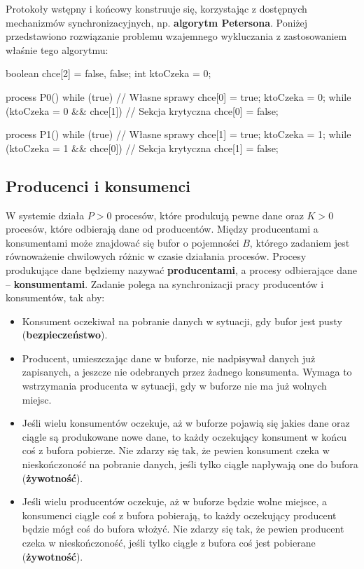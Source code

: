 Protokoły wstępny i końcowy konstruuje się, korzystając z dostępnych mechanizmów synchronizacyjnych, np. \textbf{algorytm Petersona}. Poniżej przedstawiono rozwiązanie problemu wzajemnego wykluczania z zastosowaniem właśnie tego algorytmu:
\begin{java}
    boolean chce[2] = {false, false};
    int ktoCzeka = 0;

    process P0() {
        while (true) {
            // Własne sprawy
            chce[0] = true;
            ktoCzeka = 0;
            while (ktoCzeka = 0 && chce[1]) { }
            // Sekcja krytyczna
            chce[0] = false;
        }
    }

    process P1() {
        while (true) {
            // Własne sprawy
            chce[1] = true;
            ktoCzeka = 1;
            while (ktoCzeka = 1 && chce[0]) { }
            // Sekcja krytyczna
            chce[1] = false;
        }
    }
\end{java}

\subsection{Producenci i konsumenci}

W systemie działa $P > 0$ procesów, które produkują pewne dane oraz $K > 0$ procesów, które odbierają dane od producentów. Między producentami a konsumentami może znajdować się bufor o pojemności $B$, którego zadaniem jest równoważenie chwilowych różnic w czasie działania procesów. Procesy produkujące dane będziemy nazywać \textbf{producentami}, a procesy odbierające dane -- \textbf{konsumentami}. Zadanie polega na synchronizacji pracy producentów i konsumentów, tak aby:
\begin{itemize}
    \item Konsument oczekiwał na pobranie danych w sytuacji, gdy bufor jest pusty (\textbf{bezpieczeństwo}).
    \item Producent, umieszczając dane w buforze, nie nadpisywał danych już zapisanych, a jeszcze nie odebranych przez żadnego konsumenta. Wymaga to wstrzymania producenta w sytuacji, gdy w buforze nie ma już wolnych miejsc.
    \item Jeśli wielu konsumentów oczekuje, aż w buforze pojawią się jakies dane oraz ciągle są produkowane nowe dane, to każdy oczekujący konsument w końcu coś z bufora pobierze. Nie zdarzy się tak, że pewien konsument czeka w nieskończoność na pobranie danych, jeśli tylko ciągle napływają one do bufora (\textbf{żywotność}).
    \item Jeśli wielu producentów oczekuje, aż w buforze będzie wolne miejsce, a konsumenci ciągle coś z bufora pobierają, to każdy oczekujący producent będzie mógł coś do bufora włożyć. Nie zdarzy się tak, że pewien producent czeka w nieskończoność, jeśli tylko ciągle z bufora coś jest pobierane (\textbf{żywotność}).
\end{itemize}

